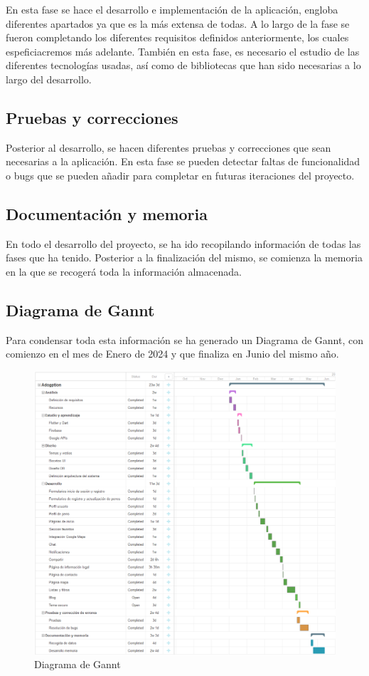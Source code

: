\documentclass[a4paper, 12pt]{article}
\begin{document}
En esta fase se hace el desarrollo e implementación de la aplicación, engloba diferentes apartados ya que es la más extensa de todas. A lo largo de la fase se fueron completando los diferentes requisitos definidos anteriormente, los cuales espeficiacremos más adelante.
También en esta fase, es necesario el estudio de las diferentes tecnologías usadas, así como de bibliotecas que han sido necesarias a lo largo del desarrollo.


\subsection{Pruebas y correcciones}

Posterior al desarrollo, se hacen diferentes pruebas y correcciones que sean necesarias a la aplicación. En esta fase se pueden detectar faltas de funcionalidad o bugs que se pueden añadir para completar en futuras iteraciones del proyecto.

\subsection{Documentación y memoria}

En todo el desarrollo del proyecto, se ha ido recopilando información de todas las fases que ha tenido. Posterior a la finalización del mismo, se comienza la memoria en la que se recogerá toda la información almacenada. 

\newpage
\subsection{Diagrama de Gannt}
Para condensar toda esta información se ha generado un Diagrama de Gannt, con comienzo en el mes de Enero de 2024 y que finaliza en Junio del mismo año.
\begin{figure}[H]
	{\includegraphics[width=15cm]{GanntSmall2.png}\par}
	\caption{Diagrama de Gannt}
\end{figure}
\end{document}
